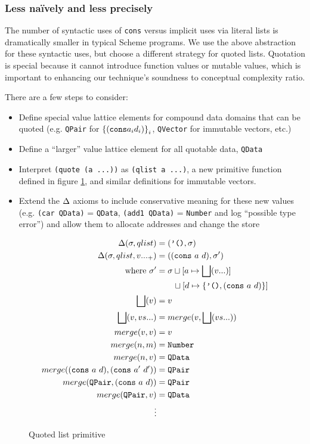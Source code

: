 \documentclass[preprint,onecolumn,9pt]{sigplanconf} %
\begin{document}
\subsubsection{Less na\"ively and less precisely}

The number of syntactic uses of {\tt cons} versus implicit uses via
literal lists is dramatically smaller in typical Scheme programs. We
use the above abstraction for these syntactic uses, but choose a
different strategy for quoted lists. Quotation is special because it
cannot introduce function values or mutable values, which is important
to enhancing our technique's soundness to conceptual complexity ratio.

There are a few steps to consider:
\begin{itemize}
 \item{Define special value lattice elements for compound data domains that can be quoted
       (e.g. {\tt QPair} for $\left\{ ({\tt cons} a_i d_i)\right\}_i$, {\tt QVector} for immutable vectors, etc.)}
 \item{Define a ``larger'' value lattice element for all quotable data, {\tt QData}}
 \item{Interpret {\tt (quote (a ...))} as {\tt (qlist a ...)}, a new primitive function defined in figure \ref{fig:qlist},
       and similar definitions for immutable vectors.}
 \item{Extend the $\Delta$ axioms to include conservative meaning for these new values (e.g. {\tt (car QData)} = {\tt QData}, {\tt (add1 QData)} = {\tt Number} and log ``possible type error'') and allow them to allocate addresses and change the store}
\end{itemize}

\begin{figure}
\begin{align*}
\Delta(\sigma, qlist) &= (\mbox{{\tt '()}}, \sigma) \\
\Delta(\sigma, qlist, v ..._+) &= (({\tt cons}\ a\ d), \sigma') \\
\qquad \mbox{where } \sigma' &= \sigma\sqcup[a \mapsto \bigsqcup(v ...)] \\
                            &\qquad \sqcup[d \mapsto \{ \mbox{{\tt '()}}, ({\tt cons}\ a\ d)\}] \\
\bigsqcup(v) &= v \\
\bigsqcup(v, vs ...) &= merge(v, \bigsqcup(vs ...)) \\
merge(v, v) &= v \\
merge(n, m) &= {\tt Number} \\
merge(n, v) &= {\tt QData} \\
merge(({\tt cons}\ a\ d), ({\tt cons}\ a'\ d')) &= {\tt QPair} \\
merge({\tt QPair}, ({\tt cons}\ a\ d)) &= {\tt QPair} \\
merge({\tt QPair}, v) &= {\tt QData} \\
\vdots
\end{align*}
\caption{Quoted list primitive}
\label{fig:qlist}
\end{figure}
\end{document}
